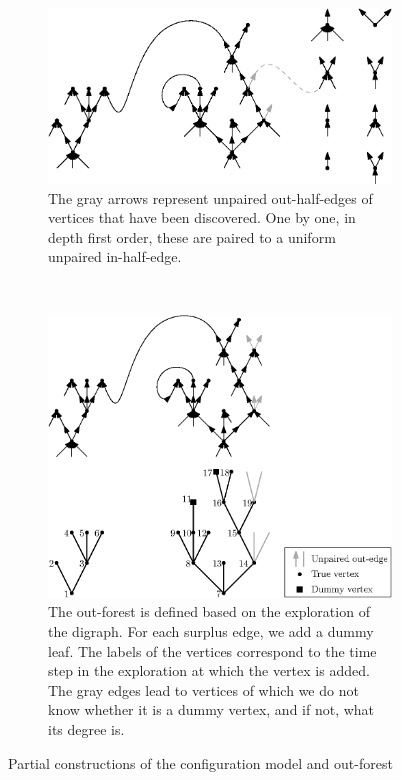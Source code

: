 \begin{figure}
    \begin{subfigure}[htbp]{\textwidth}
        \centering
        \includegraphics[scale=1]{Content/Pictures/Fig6a.eps}
        \caption{The gray arrows represent unpaired out-half-edges of vertices that have been discovered. One by one, in depth first order, these are paired to a uniform unpaired in-half-edge.}
        \label{fig.configuration model}
    \end{subfigure} \\

    \vspace{2em}

    \begin{subfigure}[htbp]{\textwidth}
        \centering
        \includegraphics[scale=1]{Content/Pictures/Fig6b.eps}
        \caption{The out-forest is defined based on the exploration of the digraph. For each surplus edge, we add a dummy leaf. The labels of the vertices correspond to the time step in the exploration at which the vertex is added. The gray edges lead to vertices of which we do not know whether it is a dummy vertex, and if not, what its degree is. }
        \label{fig.configuration modeloutforest}
    \end{subfigure}

    \caption{Partial constructions of the configuration model and out-forest}
\end{figure}

